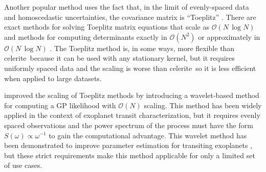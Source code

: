 \documentclass[manuscript, letterpaper]{aastex6}
\makeatletter
\let\origsubsection\subsection
\renewcommand\subsection{\@ifstar{\starsubsection}{\nostarsubsection}}
\newcommand\nostarsubsection[1]{\subsectionprelude\origsubsection{#1}}
\newcommand\starsubsection[1]{\subsectionprelude\origsubsection*{#1}}
\newcommand\subsectionprelude{\vspace{1em}}
\newcommand{\project}[1]{\textsf{#1}}
\newcommand{\celerite}{\project{celerite}}
\renewcommand{\eqref}[1]{\ref{eq:#1}}
\newcommand{\Eq}[1]{Equation~(\eqref{#1})}
\newcommand{\eq}[1]{\Eq{#1}}
\makeatother
\begin{document}
\subsection{Other scalable methods}


Another popular method uses the fact that, in the limit of evenly-spaced data
and homoscedastic uncertainties, the covariance matrix is ``Toeplitz''
\citep[for example][]{Dillon:2013}.
There are exact methods for solving Toeplitz matrix equations that scale as
$\mathcal{O}(N\,\log N)$ and methods for computing determinants exactly in
$\mathcal{O}(N^2)$ or approximately in $\mathcal{O}(N\,\log N)$
\citep{Wilson:2014}.
The Toeplitz method is, in some ways, more flexible than \celerite\ because it
can be used with any stationary kernel, but it requires uniformly spaced data
and the scaling is worse than \celerite\ so it is less efficient when applied
to large datasets.

\citet{Carter:2009} improved the scaling of Toeplitz methods by introducing a
wavelet-based method for computing a GP likelihood with $\mathcal{O}(N)$
scaling.
This method has been widely applied in the context of exoplanet transit
characterization, but it requires evenly spaced observations and the power
spectrum of the process must have the form $S(\omega)\propto \omega^{-1}$ to
gain the computational advantage.
This wavelet method has been demonstrated to improve parameter estimation for
transiting exoplanets \citep{Carter:2009}, but these strict requirements make
this method applicable for only a limited set of use cases.
\end{document}
